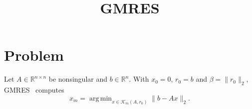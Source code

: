\documentclass{article}
\title{GMRES}
\newcommand{\R}{\mathbb{R}}
\newcommand{\K}[2]{\mathcal{K}_{#1}(#2)}
\DeclareMathOperator*{\argmin}{arg\,min}
\begin{document}
\maketitle
\section{Problem}\label{sec:problem}
Let $A\in\R^{n\times n}$ be nonsingular and $b\in\R^n$. With $x_0=0$, $r_0=b$ and
$\beta=\|r_0\|_2$, GMRES~\cite{saad1986} computes %
\begin{equation}\label{eq:gmres}
x_m=\argmin_{x\in\K{m}{A,r_0}}\|b-Ax\|_2 .
\end{equation}



\end{document}
